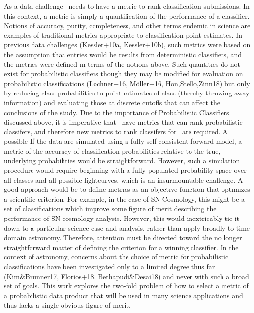 As a data challenge \plasticc\ needs to have a metric to rank classification submissions. 
In this context, a metric is simply a quantification of the performance of a classifier.
Notions of accuracy, purity, completeness, and other terms endemic in science are examples of traditional metrics appropriate to classification point estimates. 
In previous data challenges (Kessler+10a, Kessler+10b), such metrics were based on the assumption that entries would be results from deterministic classifiers, and the metrics were defined in terms of the notions above.
Such quantities do not exist for probabilistic classifiers though they may be modified for evaluation on probabilistic classifications (Lochner+16, M\"{o}ller+16, Hon,Stello,Zinn18) but only by reducing class probabilities to point estimates of class (thereby throwing away information) and evaluating those at discrete cutoffs that can affect the conclusions of the study.
Due to the importance of Probabilistic Classifiers discussed above, it is imperative that \plasticc\ have metrics
that can rank probabilistic classifers, and therefore new metrics to rank classifers for \plasticc\ are required. 
A possible 
If the data are simulated using a fully self-consistent forward model, a metric of the accuracy of classification probabilities relative to the true, underlying probabilities would be straightforward.
However, such a simulation procedure would require beginning with a fully populated probability space over all classes and all possible lightcurves, which is an insurmountable challenge.
A good approach would be to define metrics as an objective function that optimizes a scientific criterion. For example, in the case of SN Cosmology, this might be a set of classifications which improve some figure of merit describing the performance of SN cosmology analysis. However, this would inextricably tie it down to a particular science case and analysis, rather than apply broadly to time domain astronomy. 
Therefore, attention must be directed toward the no longer straightforward matter of defining the criterion for a winning classifier.
In the context of astronomy, concerns about the choice of metric for probabilistic classifications have been investigated only to a limited degree thus far (Kim\&Brunner17, Florios+18, Bethapudi\&Desai18) and never with such a broad set of goals.
This work explores the two-fold problem of how to select a metric of a probabilistic data product that will be used in many science applications and thus lacks a single obvious figure of merit.

